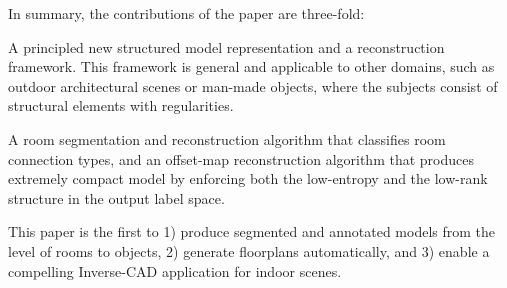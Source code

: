 In summary, the contributions of the paper are three-fold:
 
 A principled new structured
model representation and a reconstruction framework. This framework is
general and applicable to other domains, such as outdoor architectural
scenes or man-made objects,
where the subjects consist of structural elements with regularities.


 A room segmentation and
reconstruction algorithm that classifies room connection types, and an
offset-map reconstruction algorithm that produces extremely compact
model by enforcing both the low-entropy and the low-rank structure in
the output label space.

 This paper is the first to 1)
produce segmented and annotated models from the level of rooms to
objects, 2) generate floorplans automatically, and 3) enable a compelling
Inverse-CAD application for indoor scenes.











